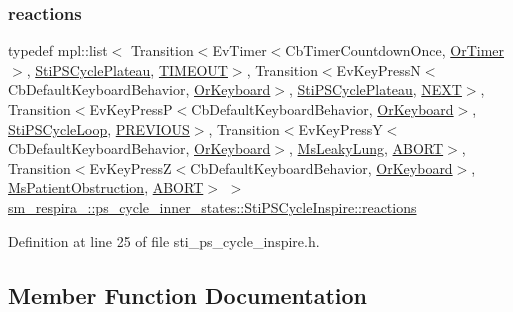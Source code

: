 \subsubsection{\texorpdfstring{reactions}{reactions}}
{\footnotesize\ttfamily typedef mpl\+::list$<$ Transition$<$Ev\+Timer$<$Cb\+Timer\+Countdown\+Once, \hyperlink{classsm__respira__1_1_1OrTimer}{Or\+Timer}$>$, \hyperlink{structsm__respira__1_1_1ps__cycle__inner__states_1_1StiPSCyclePlateau}{Sti\+P\+S\+Cycle\+Plateau}, \hyperlink{structsm__respira__1_1_1ps__cycle__inner__states_1_1StiPSCycleInspire_1_1TIMEOUT}{T\+I\+M\+E\+O\+UT}$>$, Transition$<$Ev\+Key\+PressN$<$Cb\+Default\+Keyboard\+Behavior, \hyperlink{classsm__respira__1_1_1OrKeyboard}{Or\+Keyboard}$>$, \hyperlink{structsm__respira__1_1_1ps__cycle__inner__states_1_1StiPSCyclePlateau}{Sti\+P\+S\+Cycle\+Plateau}, \hyperlink{structsm__respira__1_1_1ps__cycle__inner__states_1_1StiPSCycleInspire_1_1NEXT}{N\+E\+XT}$>$, Transition$<$Ev\+Key\+PressP$<$Cb\+Default\+Keyboard\+Behavior, \hyperlink{classsm__respira__1_1_1OrKeyboard}{Or\+Keyboard}$>$, \hyperlink{structsm__respira__1_1_1ps__cycle__inner__states_1_1StiPSCycleLoop}{Sti\+P\+S\+Cycle\+Loop}, \hyperlink{structsm__respira__1_1_1ps__cycle__inner__states_1_1StiPSCycleInspire_1_1PREVIOUS}{P\+R\+E\+V\+I\+O\+US}$>$, Transition$<$Ev\+Key\+PressY$<$Cb\+Default\+Keyboard\+Behavior, \hyperlink{classsm__respira__1_1_1OrKeyboard}{Or\+Keyboard}$>$, \hyperlink{classsm__respira__1_1_1MsLeakyLung}{Ms\+Leaky\+Lung}, \hyperlink{classABORT}{A\+B\+O\+RT}$>$, Transition$<$Ev\+Key\+PressZ$<$Cb\+Default\+Keyboard\+Behavior, \hyperlink{classsm__respira__1_1_1OrKeyboard}{Or\+Keyboard}$>$, \hyperlink{classsm__respira__1_1_1MsPatientObstruction}{Ms\+Patient\+Obstruction}, \hyperlink{classABORT}{A\+B\+O\+RT}$>$ $>$ \hyperlink{structsm__respira__1_1_1ps__cycle__inner__states_1_1StiPSCycleInspire_af0b2d05939d43e27ee47eadfc5327e93}{sm\+\_\+respira\+\_\+::ps\+\_\+cycle\+\_\+inner\+\_\+states\+::\+Sti\+P\+S\+Cycle\+Inspire\+::reactions}}



Definition at line 25 of file sti\+\_\+ps\+\_\+cycle\+\_\+inspire.\+h.



\subsection{Member Function Documentation}
\mbox{\label{structsm__respira__1_1_1ps__cycle__inner__states_1_1StiPSCycleInspire_ab06e9c79432e92e95787697c230d80c9}} 
